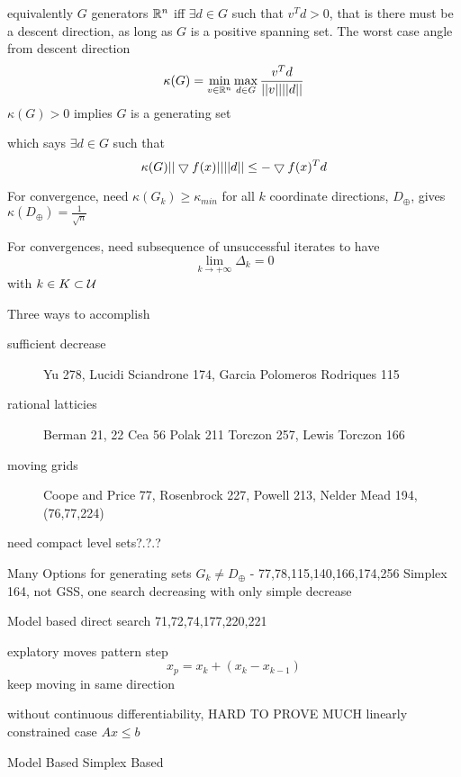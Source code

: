 equivalently
$G$ generators $\mathbb{R}^{n}$ iff $\exists d \in G$ such that $v^T d > 0$, that is there must be a descent direction, as long as $G$ is a positive spanning set.
The worst case angle from descent direction 
\begin{equation}
\kappa (G) = \min_{v \in \mathbb{R}^{n}} \max_{d\in G} \frac{v^T d}{||v|| ||d||}
\end{equation}
$\kappa (G) > 0 $ implies $G$ is a generating set

which says $\exists d \in G$ such that
\begin{equation}
\kappa (G) || \bigtriangledown f(x) || || d || \le - \bigtriangledown f(x)^T d
\end{equation}

For convergence, need $\kappa (G_k) \ge \kappa_{min}$ for all $k$
coordinate directions, $D_{\oplus}$, gives $\kappa (D_\oplus ) = \frac{1}{\sqrt{n}}$


For convergences, need subsequence of unsuccessful iterates to have
\begin{equation}
\lim_{k \rightarrow + \infty} \Delta_k = 0
\end{equation}
with $k \in K \subset \mathcal{U}$

Three ways to accomplish
\begin{description}
\item[sufficient decrease] Yu 278, Lucidi Sciandrone 174, Garcia Polomeros Rodriques 115
\item[rational latticies] Berman 21, 22 Cea 56 Polak 211 Torczon 257, Lewis Torczon 166
\item[moving grids] Coope and Price 77, Rosenbrock 227, Powell 213, Nelder Mead 194, (76,77,224)
\end{description}
need compact level sets?.?.?

Many Options for generating sets
$G_k \neq D_\oplus$ - 77,78,115,140,166,174,256
Simplex 164, not GSS, one search decreasing with only simple decrease

Model based direct search 71,72,74,177,220,221

explatory moves
pattern step
\begin{equation}
x_p = x_k + (x_k - x_{k-1})
\end{equation}
keep moving in same direction

without continuous differentiability, HARD TO PROVE MUCH
linearly constrained case $ Ax \le b$




Model Based
Simplex Based  


